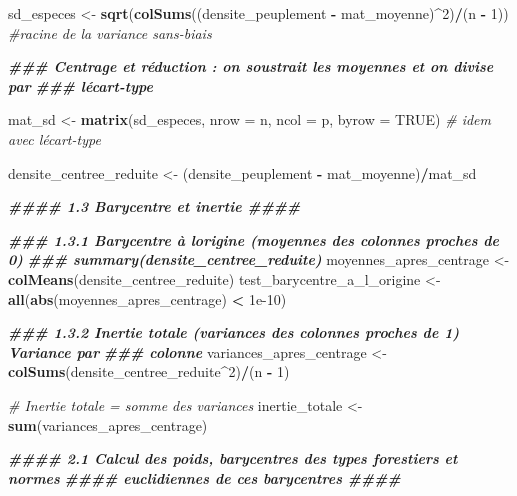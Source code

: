 \documentclass[
]{article}
\newenvironment{Shaded}{\begin{snugshade}}{\end{snugshade}}
\newcommand{\AttributeTok}[1]{\textcolor[rgb]{0.13,0.29,0.53}{#1}}
\newcommand{\CommentTok}[1]{\textcolor[rgb]{0.56,0.35,0.01}{\textit{#1}}}
\newcommand{\ConstantTok}[1]{\textcolor[rgb]{0.56,0.35,0.01}{#1}}
\newcommand{\DecValTok}[1]{\textcolor[rgb]{0.00,0.00,0.81}{#1}}
\newcommand{\DocumentationTok}[1]{\textcolor[rgb]{0.56,0.35,0.01}{\textbf{\textit{#1}}}}
\newcommand{\FloatTok}[1]{\textcolor[rgb]{0.00,0.00,0.81}{#1}}
\newcommand{\FunctionTok}[1]{\textcolor[rgb]{0.13,0.29,0.53}{\textbf{#1}}}
\newcommand{\NormalTok}[1]{#1}
\newcommand{\OtherTok}[1]{\textcolor[rgb]{0.56,0.35,0.01}{#1}}
\newcommand{\SpecialCharTok}[1]{\textcolor[rgb]{0.81,0.36,0.00}{\textbf{#1}}}
\begin{document}
\begin{Shaded}
\begin{Highlighting}[]
\NormalTok{sd\_especes }\OtherTok{\textless{}{-}} \FunctionTok{sqrt}\NormalTok{(}\FunctionTok{colSums}\NormalTok{((densite\_peuplement }\SpecialCharTok{{-}}\NormalTok{ mat\_moyenne)}\SpecialCharTok{\^{}}\DecValTok{2}\NormalTok{)}\SpecialCharTok{/}\NormalTok{(n }\SpecialCharTok{{-}} \DecValTok{1}\NormalTok{))  }\CommentTok{\#racine de la variance sans{-}biais }

\DocumentationTok{\#\#\# Centrage et réduction : on soustrait les moyennes et on divise par}
\DocumentationTok{\#\#\# l\textquotesingle{}écart{-}type}

\NormalTok{mat\_sd }\OtherTok{\textless{}{-}} \FunctionTok{matrix}\NormalTok{(sd\_especes, }\AttributeTok{nrow =}\NormalTok{ n, }\AttributeTok{ncol =}\NormalTok{ p, }\AttributeTok{byrow =} \ConstantTok{TRUE}\NormalTok{)}
\CommentTok{\# idem avec l\textquotesingle{}écart{-}type}

\NormalTok{densite\_centree\_reduite }\OtherTok{\textless{}{-}}\NormalTok{ (densite\_peuplement }\SpecialCharTok{{-}}\NormalTok{ mat\_moyenne)}\SpecialCharTok{/}\NormalTok{mat\_sd}

\DocumentationTok{\#\#\#\# 1.3 Barycentre et inertie \#\#\#\#}

\DocumentationTok{\#\#\# 1.3.1 Barycentre à l\textquotesingle{}origine (moyennes des colonnes proches de 0)}
\DocumentationTok{\#\#\# summary(densite\_centree\_reduite)}
\NormalTok{moyennes\_apres\_centrage }\OtherTok{\textless{}{-}} \FunctionTok{colMeans}\NormalTok{(densite\_centree\_reduite)}
\NormalTok{test\_barycentre\_a\_l\_origine }\OtherTok{\textless{}{-}} \FunctionTok{all}\NormalTok{(}\FunctionTok{abs}\NormalTok{(moyennes\_apres\_centrage) }\SpecialCharTok{\textless{}} \FloatTok{1e{-}10}\NormalTok{)}

\DocumentationTok{\#\#\# 1.3.2 Inertie totale (variances des colonnes proches de 1) Variance par}
\DocumentationTok{\#\#\# colonne}
\NormalTok{variances\_apres\_centrage }\OtherTok{\textless{}{-}} \FunctionTok{colSums}\NormalTok{(densite\_centree\_reduite}\SpecialCharTok{\^{}}\DecValTok{2}\NormalTok{)}\SpecialCharTok{/}\NormalTok{(n }\SpecialCharTok{{-}} \DecValTok{1}\NormalTok{)}

\CommentTok{\# Inertie totale = somme des variances}
\NormalTok{inertie\_totale }\OtherTok{\textless{}{-}} \FunctionTok{sum}\NormalTok{(variances\_apres\_centrage)}

\DocumentationTok{\#\#\#\# 2.1 Calcul des poids, barycentres des types forestiers et normes}
\DocumentationTok{\#\#\#\# euclidiennes de ces barycentres \#\#\#\#}


\end{Highlighting}
\end{Shaded}
\end{document}
